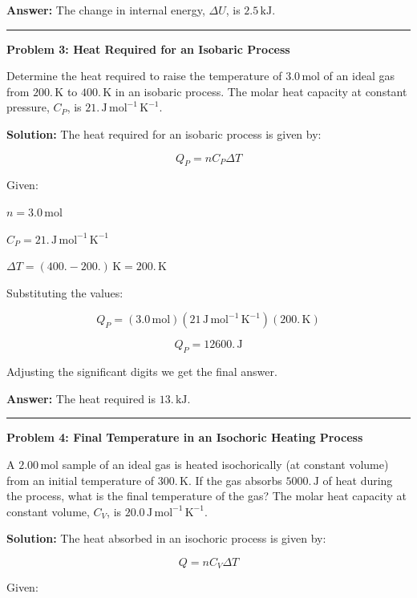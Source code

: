 \documentclass[
  9pt,
]{extbook}
\theoremstyle{definition}
\theoremstyle{definition}
\theoremstyle{definition}
\theoremstyle{remark}
\begin{document}
\textbf{Answer:} The change in internal energy, \(\Delta U\), is \(2.5 \, \text{kJ}\).

\begin{center}\rule{0.5\linewidth}{0.5pt}\end{center}

\textbf{Problem 3: Heat Required for an Isobaric Process}

Determine the heat required to raise the temperature of \(3.0 \, \text{mol}\) of an ideal gas from \(200. \, \text{K}\) to \(400. \, \text{K}\) in an isobaric process. The molar heat capacity at constant pressure, \(C_P\), is \(21. \, \text{J} \, \text{mol}^{-1} \, \text{K}^{-1}\).

\textbf{Solution:} The heat required for an isobaric process is given by:

\[ Q_P = n C_P \Delta T \]

Given:

\(n = 3.0 \, \text{mol}\)

\(C_P = 21. \, \text{J} \, \text{mol}^{-1} \, \text{K}^{-1}\)

\(\Delta T = (400. - 200.) \, \text{K} = 200. \, \text{K}\)

Substituting the values:

\[ Q_P = (3.0 \, \text{mol})(21 \, \text{J} \, \text{mol}^{-1} \, \text{K}^{-1})(200. \, \text{K}) \]

\[ Q_P = 12600. \, \text{J} \]

Adjusting the significant digits we get the final answer.

\textbf{Answer:} The heat required is \(13. \, \text{kJ}\).

\begin{center}\rule{0.5\linewidth}{0.5pt}\end{center}

\textbf{Problem 4: Final Temperature in an Isochoric Heating Process}

A \(2.00 \, \text{mol}\) sample of an ideal gas is heated isochorically (at constant volume) from an initial temperature of \(300. \, \text{K}\). If the gas absorbs \(5000. \, \text{J}\) of heat during the process, what is the final temperature of the gas? The molar heat capacity at constant volume, \(C_V\), is \(20.0 \, \text{J} \, \text{mol}^{-1} \, \text{K}^{-1}\).

\textbf{Solution:} The heat absorbed in an isochoric process is given by:

\[ Q = n C_V \Delta T \]

Given:
\end{document}
